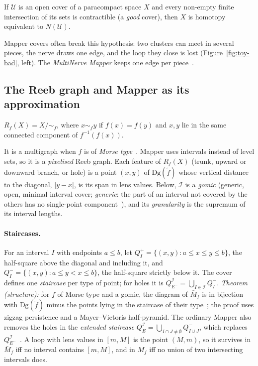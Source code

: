 \begin{theorem}
\label{thm:nerve}
If $\mathcal{U}$ is an open cover of a paracompact space $X$ and every
non-empty finite intersection of its sets is contractible (a \emph{good}
cover), then $X$ is homotopy equivalent to $N(\mathcal{U})$.
\end{theorem}

Mapper covers often break this hypothesis: two clusters can meet in
several pieces, the nerve draws one edge, and the loop they close is lost
(Figure~\ref{fig:toy-bad}, left). The \emph{MultiNerve Mapper} keeps one
edge per piece~\cite[Sec.~3]{carriere2018structure}.

\subsection{The Reeb graph and Mapper as its approximation}
\label{sec:reeb}

\begin{definition}
$R_f(X)=X/{\sim_f}$, where $x\sim_f y$ if $f(x)=f(y)$ and $x,y$ lie in the
same connected component of $f^{-1}(f(x))$.
\end{definition}

It is a multigraph when $f$ is of \emph{Morse type}~\cite[Def.~2.1]{carriere2018structure}.
Mapper uses intervals instead of level sets, so it is a \emph{pixelised}
Reeb graph. Each feature of $R_f(X)$ (trunk, upward or downward branch, or hole) is a
point $(x,y)$ of $\mathrm{Dg}(\tilde f)$ whose vertical distance to the
diagonal, $|y-x|$, is its span in lens values. Below, $\mathcal{I}$ is a
\emph{gomic} (generic, open, minimal interval cover; \emph{generic}: the
part of an interval not covered by the others has no single-point
component~\cite[Sec.~2.5]{carriere2018structure}), and its
\emph{granularity} is the supremum of its interval lengths.

\paragraph{Staircases.} For an interval $I$ with endpoints $a\le b$, let
$Q_I^+=\{(x,y):a\le x\le y\le b\}$, the half-square above the diagonal
and including it, and $Q_I^-=\{(x,y):a\le y<x\le b\}$, the half-square
strictly below it. The cover defines one \emph{staircase} per type of
point; for holes it is $Q^{\mathcal I}_{E^-}=\bigcup_{I\in\mathcal{I}}Q_I^-$.
\emph{Theorem (structure):} for $f$ of Morse type and a gomic, the
diagram of $\bar M_f$ is in bijection with $\mathrm{Dg}(\tilde f)$ minus
the points lying in the staircase of their
type~\cite[Thm.~4.3]{carriere2018structure}; the proof uses zigzag
persistence and a Mayer--Vietoris half-pyramid. The ordinary Mapper also
removes the holes in the \emph{extended staircase}
$Q^{\mathcal I}_E=\bigcup_{I\cap J\neq\emptyset}Q^-_{I\cup J}$, which
replaces $Q^{\mathcal I}_{E^-}$~\cite[Sec.~4.3, Eq.~(6)]{carriere2018structure}.
A loop with lens values in $[m,M]$ is the point $(M,m)$, so it survives
in $\bar M_f$ iff no interval contains $[m,M]$, and in $M_f$ iff no union
of two intersecting intervals does.

